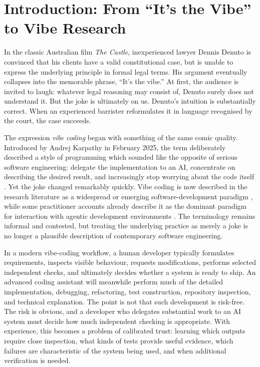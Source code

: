 \documentclass[12pt]{article}
\begin{document}
\clearpage

{}
\tableofcontents
\clearpage

\section{Introduction: From ``It's the Vibe'' to Vibe Research}

In the classic Australian film \emph{The Castle},  inexperienced lawyer Dennis Denuto is convinced that his clients have a valid constitutional case, but is unable to express the underlying principle in formal legal terms. His argument eventually collapses into the memorable phrase, ``It's the vibe.'' At first, the audience is invited to laugh: whatever legal reasoning may consist of, Denuto surely does not understand it. But the joke is ultimately on us. Denuto's intuition is substantially correct. When an experienced barrister reformulates it in language recognised by the court, the case succeeds.

The expression \emph{vibe coding} began with something of the same comic quality. Introduced by Andrej Karpathy in February 2025, the term deliberately described a style of programming which sounded like the opposite of serious software engineering: delegate the implementation to an AI, concentrate on describing the desired result, and increasingly stop worrying about the code itself \citep{fowler2026vibecoding}.
Yet the joke changed remarkably quickly. Vibe coding is now described in the research literature as a widespread or emerging software-development paradigm \citep{meskeEtAl2025vibecoding,sarkarDrosos2025vibecoding}, while some practitioner accounts already describe it as the dominant paradigm for interaction with agentic development environments \citep{nimblabs2026vibecoding}. The terminology remains informal and contested, but treating the underlying practice as merely a joke is no longer a plausible description of contemporary software engineering.

In a modern vibe-coding workflow, a human developer typically formulates requirements, inspects visible behaviour, requests modifications, performs selected independent checks, and ultimately decides whether a system is ready to ship. An advanced coding assistant will meanwhile perform much of the detailed implementation, debugging, refactoring, test construction, repository inspection, and technical explanation.
The point is not that such development is risk-free. The risk is obvious, and a developer who delegates substantial work to an AI system must decide how much independent checking is appropriate. With experience, this becomes a problem of calibrated trust: learning which outputs require close inspection, what kinds of tests provide useful evidence, which failures are characteristic of the system being used, and when additional verification is needed.
\end{document}

